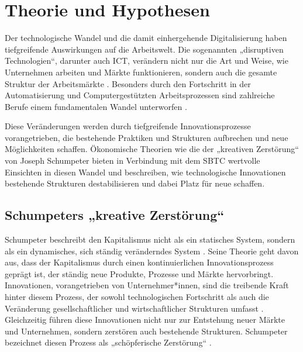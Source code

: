
\section{Theorie und Hypothesen}

Der technologische Wandel und die damit einhergehende Digitalisierung haben tiefgreifende 
Auswirkungen auf die Arbeitswelt. Die sogenannten „disruptiven Technologien“, darunter auch 
\ac{ICT}, verändern nicht nur die Art und Weise, wie Unternehmen arbeiten und Märkte 
funktionieren, sondern auch die gesamte Struktur der Arbeitsmärkte 
\parencite[vgl.][S. 27]{brynjolfsson2014thesecond}. Besonders durch den Fortschritt in der 
Automatisierung und Computergestützten Arbeitsprozessen sind zahlreiche Berufe einem 
fundamentalen Wandel unterworfen \parencite[vgl.][S. 256]{frey2013thefuture}.

Diese Veränderungen werden durch tiefgreifende Innovationsprozesse vorangetrieben, die 
bestehende Praktiken und Strukturen aufbrechen und neue Möglichkeiten schaffen. Ökonomische 
Theorien wie die der „kreativen Zerstörung“ von Joseph Schumpeter 
\parencite[vgl.][S. 81]{schumpeter1976capitalism} bieten in Verbindung mit dem \ac{SBTC} wertvolle 
Einsichten in diesen Wandel und beschreiben, wie technologische Innovationen bestehende 
Strukturen destabilisieren und dabei Platz für neue schaffen.


\subsection{Schumpeters „kreative Zerstörung“}

Schumpeter beschreibt den Kapitalismus nicht als ein statisches System, sondern als ein 
dynamisches, sich ständig veränderndes System \parencite[vgl.][S. 82]{schumpeter1976capitalism}. 
Seine Theorie geht davon aus, dass der Kapitalismus durch einen kontinuierlichen 
Innovationsprozess geprägt ist, der ständig neue Produkte, Prozesse und Märkte hervorbringt. 
Innovationen, vorangetrieben von Unternehmer*innen, sind die treibende Kraft hinter diesem 
Prozess, der sowohl technologischen Fortschritt als auch die Veränderung gesellschaftlicher 
und wirtschaftlicher Strukturen umfasst \parencite[vgl.][S. 82]{schumpeter1976capitalism}. 
Gleichzeitig führen diese Innovationen nicht nur zur Entstehung neuer Märkte und 
Unternehmen, sondern zerstören auch bestehende Strukturen. Schumpeter bezeichnet diesen 
Prozess als „schöpferische Zerstörung“ \parencite[vgl.][S. 103–105]{schumpeter1976capitalism}.


